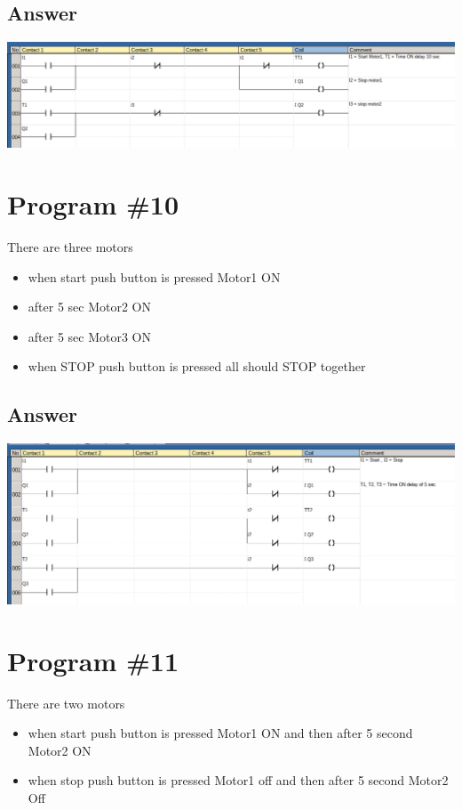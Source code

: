 \documentclass[
	12pt, %
]{fphw}
\begin{document}
\subsection*{Answer}
     \begin{center}
      \includegraphics[width=165mm, scale=0.80]{prg11.png}
    \end{center}

\section*{Program \#10}
\begin{problem}
  There are three motors
  \medskip
  \begin{itemize}
  \item when start push button is pressed Motor1 ON
  \item after 5 sec Motor2 ON
  \item after 5 sec Motor3 ON
  \item when STOP push button is pressed all should STOP together
  \end{itemize}
\end{problem}
\subsection*{Answer}
\begin{center}
  \includegraphics[width=165mm, scale=0.80]{prg12.png}
\end{center}

\section*{Program \#11}
\begin{problem}
  There are two motors
  \medskip
  \begin{itemize}
   \item when start push button is pressed Motor1 ON and then after 5 second
     Motor2 ON
   \item when stop push button is pressed Motor1 off and then after 5 second Motor2 Off
  \end{itemize}
\end{problem}
\end{document}
